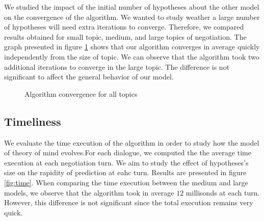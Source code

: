 \documentclass[sigconf]{aamas}  %
\begin{document}
	We studied the impact of the initial number of hypotheses about the other model on the convergence of the algorithm. We wanted to study weather a large number of hypotheses will need extra iterations to converge. Therefore, we compared results obtained for small topic, medium, and large topics of negotiation. The graph presented in figure \ref{fig:converge} shows that our algorithm converges in average quickly independently from the size of topic. We can observe that the algorithm took two additional iterations to converge in the large topic. The difference is not significant to affect the general behavior of our model.
	
		\begin{figure}[]
			\caption{Algorithm convergence for all topics} 
			\label{fig:converge}
		\end{figure}
	
	
	\subsection{Timeliness}
	We evaluate the time execution of the algorithm in order to study how the model of theory of mind evolves.For each dialogue, we computed the the average time execution at each negotiation turn. We aim to study the effect of hypotheses's size on the rapidity of prediction at eahc turn. Results are presented in figure \ref{fig:time}. When comparing the time execution between the medium and large models, we observe that the algorithm took in average $12$ millisonds at each turn. However, this difference is not significant since the total execution remains very quick.
	
\end{document}
